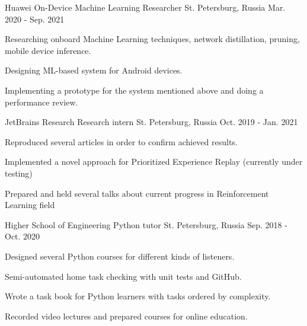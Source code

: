 

\begin{cventries}
	
\cventry
	{Huawei} %
	{On-Device Machine Learning Researcher} %
	{St. Petersburg, Russia} %
	{Mar. 2020 - Sep. 2021} %
	{
		\begin{cvitems} %
			\item {Researching onboard Machine Learning techniques, network distillation, pruning, mobile device inference.}
			\item {Designing ML-based system for Android devices.}
			\item {Implementing a prototype for the system mentioned above and doing a performance review.}
		\end{cvitems}
	}
	
  \cventry
	{JetBrains Research} %
	{Research intern} %
	{St. Petersburg, Russia} %
	{Oct. 2019 - Jan. 2021} %
	{
		\begin{cvitems} %
			\item {Reproduced several articles in order to confirm achieved results.}
			\item {Implemented a novel approach for Prioritized Experience Replay (currently under testing)}
			\item {Prepared and held several talks about current progress in Reinforcement Learning field}
		\end{cvitems}
}

  \cventry
    {Higher School of Engineering} %
    {Python tutor} %
    {St. Petersburg, Russia} %
    {Sep. 2018 - Oct. 2020} %
    {
		\begin{cvitems} %
		 \item {Designed several Python courses for different kinds of listeners.}
		 \item {Semi-automated home task checking with unit tests and GitHub.}
		 \item {Wrote a task book for Python learners with tasks ordered by complexity.}
		 \item {Recorded video lectures and prepared courses for online education.}
		\end{cvitems}
    }


\end{cventries}
